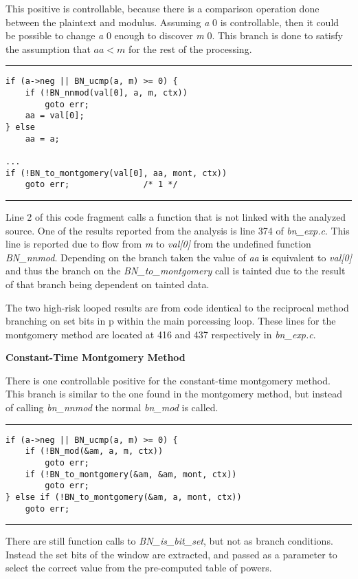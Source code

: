 \documentclass[11pt,a4paper]{article}
\newcommand{\codevar}[1]{\textit{#1}}
\newcommand{\codefn}[1]{\textit{#1}}
\newcommand{\codefile}[1]{\textit{#1}}
\newcommand{\ruleabove}{\vspace{5pt}\hrule}
\newcommand{\rulebelow}{\hrule\vspace{5pt}}
\begin{document}
   This positive is controllable, because there is a comparison operation done
   between the plaintext and modulus. Assuming \codevar{a} 0 is controllable, then it
   could be possible to change \codevar{a} 0 enough to discover \codevar{m} 0. This branch is
   done to satisfy the assumption that $aa < m$ for the rest of the processing.


\ruleabove
\begin{lstlisting}[caption=OpenSSL 1.1.0g - bn\_exp.c lines 363-368]
if (a->neg || BN_ucmp(a, m) >= 0) {
    if (!BN_nnmod(val[0], a, m, ctx))
        goto err;
    aa = val[0];
} else
    aa = a;

... 
if (!BN_to_montgomery(val[0], aa, mont, ctx))
    goto err;               /* 1 */
\end{lstlisting}
\rulebelow

  Line 2 of this code fragment calls a function that is not linked with the
  analyzed source. One of the results reported from the analysis is line 374 of
  \codefile{bn\_exp.c}. This line is reported due to flow from \codevar{m} to \codevar{val[0]} from the
  undefined function \codefn{BN\_nnmod}. Depending on the branch taken the value of \codevar{aa}
  is equivalent to \codevar{val[0]} and thus the branch on the \codefn{BN\_to\_montgomery} call is
  tainted due to the result of that branch being dependent on tainted data.
  
  The two high-risk looped results are from code identical to the reciprocal
  method branching on set bits in p within the main porcessing loop. These lines
  for the montgomery method are located at 416 and 437 respectively in \codefile{bn\_exp.c}.

\noindent
\textbf{Constant-Time Montgomery Method}

There is one controllable positive for the constant-time montgomery method.
This branch is similar to the one found in the montgomery method, but instead
of calling \codefn{bn\_nnmod} the normal \codefn{bn\_mod} is called. 

\ruleabove
\begin{lstlisting}[caption=OpenSSL 1.1.0g - bn\_exp.c lines 752-758]
if (a->neg || BN_ucmp(a, m) >= 0) {
    if (!BN_mod(&am, a, m, ctx))
        goto err;
    if (!BN_to_montgomery(&am, &am, mont, ctx))
        goto err;
} else if (!BN_to_montgomery(&am, a, mont, ctx))
    goto err;
\end{lstlisting}
\rulebelow

There are still function calls to \codefn{BN\_is\_bit\_set}, but not as branch
conditions. Instead the set bits of the window are extracted, and passed as a
parameter to select the correct value from the pre-computed table of powers.
\end{document}

